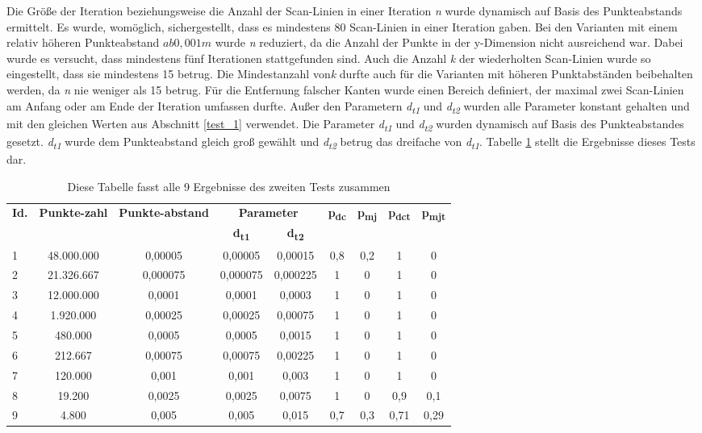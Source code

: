 Die Größe der Iteration beziehungsweise die Anzahl der Scan-Linien in einer Iteration \textit{n} wurde dynamisch auf Basis des Punkteabstands ermittelt. Es wurde, womöglich, sichergestellt, dass es mindestens 80 Scan-Linien in einer Iteration gaben. Bei den Varianten mit einem relativ höheren Punkteabstand \(ab 0,001m\) wurde \textit{n} reduziert, da die Anzahl der Punkte in der y-Dimension nicht ausreichend war. Dabei wurde es versucht, dass mindestens fünf Iterationen stattgefunden sind. Auch die Anzahl \textit{k} der wiederholten Scan-Linien wurde so eingestellt, dass sie mindestens 15 betrug. Die Mindestanzahl von\textit{k} durfte auch für die Varianten mit höheren Punktabständen beibehalten werden, da \textit{n} nie weniger als 15 betrug. Für die Entfernung falscher Kanten wurde einen Bereich definiert, der maximal zwei Scan-Linien am Anfang oder am Ende der Iteration umfassen durfte. Außer den Parametern \textit{d\textsubscript{t1}} und \textit{d\textsubscript{t2}} wurden alle Parameter konstant gehalten und mit den gleichen Werten aus Abschnitt \ref{test_1} verwendet. Die Parameter \textit{d\textsubscript{t1}} und \textit{d\textsubscript{t2}} wurden dynamisch auf Basis des Punkteabstandes gesetzt. \textit{d\textsubscript{t1}} wurde dem Punkteabstand gleich groß gewählt und \textit{d\textsubscript{t2}} betrug das dreifache von \textit{d\textsubscript{t1}}. Tabelle \ref{table: test_2_results} stellt die Ergebnisse dieses Tests dar.

\begin{table}[t]
	\centering
	\begin{tabular}[width = \textwidth]{l *{8}{c}}
		\hline
		\multirow{2}{2em}{\textbf{Id.}} & \multirow{2}{3em}{\textbf{Punkte-zahl}} & \multirow{2}{3em}{\textbf{Punkte-abstand}} & \multicolumn{2}{c}{\textbf{Parameter}} & \multirow{2}{*}{\textbf{p\textsubscript{dc}}} & \multirow{2}{*}{\textbf{p\textsubscript{mj}}} & \multirow{2}{*}{\textbf{p\textsubscript{dct}}} & \multirow{2}{*}{\textbf{p\textsubscript{mjt}}} \\
		& & & \textbf{d\textsubscript{t1}} &\textbf{d\textsubscript{t2}} & & & & \\
		\hline
		1 & 48.000.000 & 0,00005 & 0,00005 & 0,00015 & 0,8 & 0,2 & 1 & 0 \\
		2 & 21.326.667 & 0,000075 & 0,000075 & 0,000225 & 1 & 0 & 1 & 0 \\
		3 & 12.000.000 & 0,0001 & 0,0001 & 0,0003 & 1 & 0 & 1 & 0 \\
		4 & 1.920.000 & 0,00025 & 0,00025 & 0,00075 & 1 & 0 & 1 & 0 \\
		5 & 480.000 & 0,0005 & 0,0005 & 0,0015 & 1 & 0 & 1 & 0 \\
		6 & 212.667 & 0,00075 & 0,00075 & 0,00225 & 1 & 0 & 1 & 0 \\
		7 & 120.000 & 0,001	& 0,001 & 0,003 & 1 & 0 & 1 & 0 \\
		8 & 19.200 & 0,0025 & 0,0025 & 0,0075 & 1 & 0 & 0,9 & 0,1 \\
		9 & 4.800 & 0,005 & 0,005 & 0,015 & 0,7 & 0,3 & 0,71 & 0,29 \\
		\hline 
	\end{tabular}
	\caption{Diese Tabelle fasst alle 9 Ergebnisse des zweiten Tests zusammen}
	\label{table: test_2_results}
\end{table}

